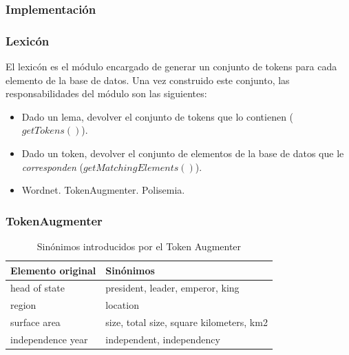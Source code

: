 \subsubsection*{Implementación}
\begin{frame}
\frametitle{Lexicón}
  El lexicón es el módulo encargado de generar un conjunto de tokens para cada elemento de la base de datos. Una vez construido este conjunto, las responsabilidades del módulo son las siguientes:
\begin{itemize}
  \item Dado un lema, devolver el conjunto de tokens que lo contienen ($getTokens()$).
  \item Dado un token, devolver el conjunto de elementos de la base de datos que le \textit{corresponden} ($getMatchingElements()$).
  \item Wordnet. TokenAugmenter. Polisemia.
\end{itemize}
\end{frame}

\begin{frame}
\frametitle{TokenAugmenter}
\begin{center}
\begin{table}[h]
\centering
\begin{tabular}{| l |  p{8cm} |}
\hline
Elemento original & Sinónimos \\ \hline
head of state & president, leader, emperor, king \\ \hline
region & location\\ \hline
surface area & size, total size, square kilometers, km2\\ \hline
independence year & independent, independency\\ \hline
\end{tabular}
\caption{Sinónimos introducidos por el Token Augmenter}
\label{table:token-augmenter}
\end{table}
\end{center}
\end{frame}


